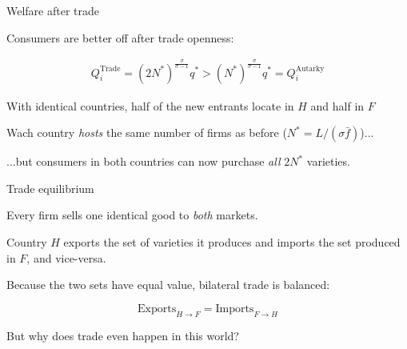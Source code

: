 \documentclass[notes,11pt, aspectratio=169, xcolor=table]{beamer}
\newenvironment{wideitemize}{\itemize\addtolength{\itemsep}{10pt}}{\enditemize}
\begin{document}
\begin{frame}{Welfare after trade}
\begin{wideitemize}
    \item Consumers are better off after trade openness:

\begin{eqnarray*}
         Q_i^{\text{Trade}} = (2 N^*)^{\frac{\sigma}{\sigma-1}} q^* > (N^*)^{\frac{\sigma}{\sigma-1}} q^* =Q_i^{\text{Autarky}}
\end{eqnarray*}

\item With identical countries, half of the new entrants locate in $H$ and half in $F$

\item Wach country \emph{hosts} the same number of firms as before ($N^{*}=L/(\sigma\bar f)$)...

\item ...but consumers in both countries can now purchase \emph{all} $2N^*$ varieties.

\end{wideitemize}
\end{frame}

\begin{frame}{Trade equilibrium}

\begin{wideitemize}
    \item Every firm sells one identical good to \emph{both} markets.
    
    \item<2-> Country $H$ exports the set of varieties it produces and imports the set produced in $F$, and vice-versa.
    
    \item<3-> Because the two sets have equal value, bilateral trade is balanced:

    \begin{equation*}
        \text{Exports}_{H\to F} = \text{Imports}_{F\to H}
    \end{equation*}

    \item<4-> But why does trade even happen in this world?
    
\end{wideitemize}
    
\end{frame}
\end{document}
